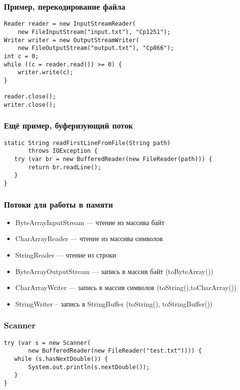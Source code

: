 \documentclass[xetex,mathserif,serif]{beamer}
\begin{document}
	\begin{frame}[fragile]
		\frametitle{Пример, перекодирование файла}
		\begin{verbatim}
Reader reader = new InputStreamReader(
    new FileInputStream("input.txt"), "Cp1251");
Writer writer = new OutputStreamWriter(
    new FileOutputStream("output.txt"), "Cp866");
int c = 0;
while ((c = reader.read()) >= 0) {
    writer.write(c);
}

reader.close();
writer.close();
		\end{verbatim}
	\end{frame}

	\begin{frame}[fragile]
		\frametitle{Ещё пример, буферизующий поток}
		\begin{verbatim}
static String readFirstLineFromFile(String path)
       throws IOException {
   try (var br = new BufferedReader(new FileReader(path))) {
       return br.readLine();
   }
}
		\end{verbatim}
	\end{frame}

	\begin{frame}
		\frametitle{Потоки для работы в памяти}
		\begin{itemize}
			\item ByteArrayInputStream --- чтение из массива байт
			\item CharArrayReader --- чтение из массива символов
			\item StringReader --- чтение из строки
			\item ByteArrayOutputStream --- запись в массив байт (toByteArray())
			\item CharArrayWriter --- запись в массив символов (toString(),toCharArray())
			\item StringWriter – запись в StringBuffer (toString(), toStringBuffer())
		\end{itemize}
	\end{frame}

	\begin{frame}[fragile]
		\frametitle{Scanner}
		\begin{verbatim}
try (var s = new Scanner(
       new BufferedReader(new FileReader("test.txt")))) {
   while (s.hasNextDouble()) {
       System.out.println(s.nextDouble());
   }
}
		\end{verbatim}
	\end{frame}
\end{document}
